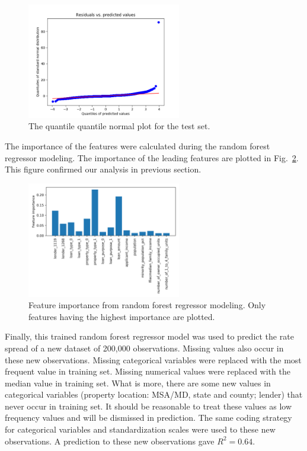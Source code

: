\documentclass[a4paper,10pt,notitlepage]{article}
\begin{document}
\begin{figure}[H]
\centering
\includegraphics[width=0.6\textwidth]{quantile_quantile_normal_plot.png}
\caption{The quantile quantile normal plot for the test set.}
\label{fig:qq}
\end{figure}

The importance of the features were calculated during the random forest regressor modeling.
The importance of the leading features are plotted in Fig.~\ref{fig:importance}. This figure confirmed our analysis in previous section.  

\begin{figure}[H]
\centering
\includegraphics[width=0.6\textwidth]{feature_importance.png}
\caption{Feature importance from random forest regressor modeling. Only features having the highest importance are plotted.}
\label{fig:importance}
\end{figure}



Finally, this trained random forest regressor model was used to predict the rate spread of a new dataset of 200,000 observations. 
Missing values also occur in these new observations. Missing categorical variables were replaced with the most frequent value in training set. Missing numerical values were replaced with the median value in training set. 
What is more, there are some new values in categorical variables (property location: MSA/MD, state and county; lender) that never occur in training set. 
It should be reasonable to treat these values as low frequency values and will be dismissed in prediction. 
The same coding strategy for categorical variables and standardization scales were used to these new observations. 
A prediction to these new observations gave $R^2 = 0.64$.
\end{document}

